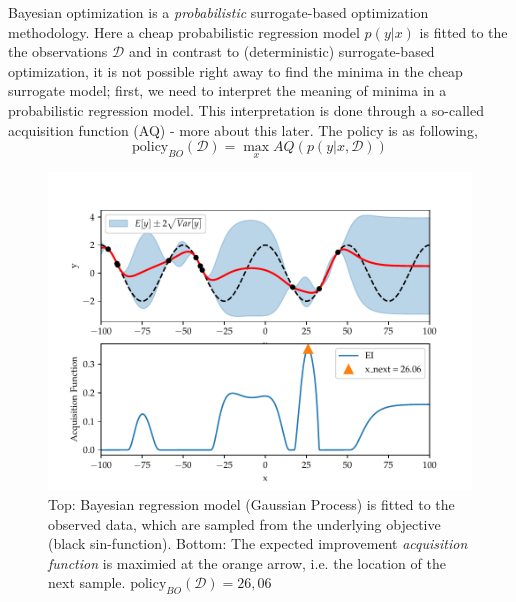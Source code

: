 \begin{testexample}
    Bayesian optimization is a \textit{probabilistic} surrogate-based optimization
    methodology. Here a cheap probabilistic regression model $p(y|x)$ is fitted to the
    the observations $\mathcal{D}$ and in contrast to (deterministic) surrogate-based
    optimization, it is not possible right away to find the minima in the cheap
    surrogate model; first, we need to interpret the meaning of minima in a probabilistic
    regression model. This interpretation is done through a so-called acquisition
    function (AQ) - more about this later. The policy is as following,
    $$\text{policy}_{BO}(\mathcal{D}) = \max_x AQ(p(y|x,\mathcal{D}))$$

    \begin{figure}[H]
        \begin{minipage}[c]{0.67\textwidth}
          \includegraphics[width=\textwidth]{Pictures/BO_example.pdf}
        \end{minipage}\hfill
        \begin{minipage}[c]{0.3\textwidth}
          \caption{Top: Bayesian regression model (Gaussian Process) is fitted to the observed data,
          which are sampled from the underlying objective (black sin-function). Bottom: The expected improvement
          \textit{acquisition function} is maximied at the orange arrow, i.e. the location of the
          next sample.  $\text{policy}_{BO}(\mathcal{D}) = 26,06$} \label{BO_example}
        \end{minipage}
    \end{figure}
\end{testexample}


